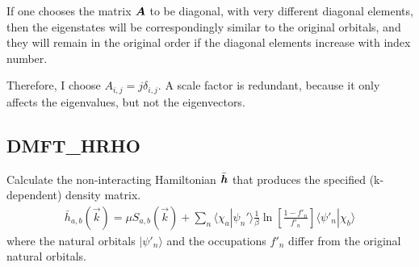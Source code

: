 \documentclass[11pt,a4paper]{report}
\begin{document}
If one chooses the matrix $\bm{A}$ to be diagonal, with very
different diagonal elements, then the eigenstates will be
correspondingly similar to the original orbitals, and they will remain
in the original order if the diagonal elements increase with index
number.

Therefore, I choose $A_{i,j}=j\delta_{i,j}$. A scale factor is
redundant, because it only affects the eigenvalues, but not the
eigenvectors.


\subsection{DMFT\_HRHO}
\label{sec:routinedmfthrho}
Calculate the non-interacting Hamiltonian $\bar{\bm{h}}$ that
produces the specified (k-dependent) density matrix.
\begin{eqnarray}
\bar{h}_{a,b}(\vec{k})=\mu S_{a,b}(\vec{k})+\sum_n\langle\chi_a|\psi_n'\rangle
\frac{1}{\beta}\ln\left[\frac{1-f'_n}{f'_n}\right]
\langle\psi'_n|\chi_b\rangle
\end{eqnarray}
where the natural orbitals $|\psi'_n\rangle$ and the occupations
$f'_n$ differ from the original natural orbitals.
\end{document}
